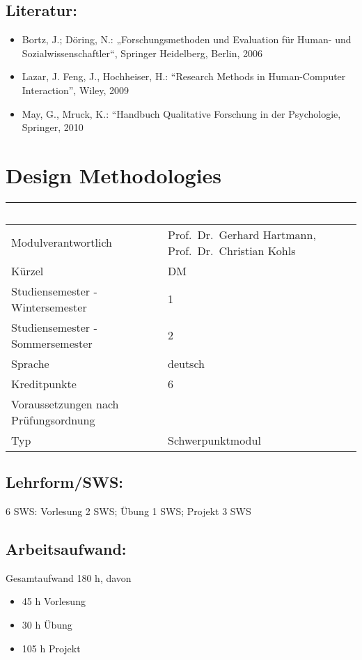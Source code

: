 \section*{Literatur:}\label{literatur-3}

\begin{itemize}
\item
  Bortz, J.; Döring, N.: „Forschungsmethoden und Evaluation für Human-
  und Sozialwissenschaftler``, Springer Heidelberg, Berlin, 2006
\item
  Lazar, J. Feng, J., Hochheiser, H.: ``Research Methods in
  Human-Computer Interaction'', Wiley, 2009
\item
  May, G., Mruck, K.: ``Handbuch Qualitative Forschung in der
  Psychologie, Springer, 2010
\end{itemize}

\chapter{Design Methodologies}\label{design-methodologies}

\begin{longtable}[]{@{}ll@{}}
\toprule
~ & ~\tabularnewline
\midrule
\endhead
Modulverantwortlich & Prof.~Dr.~Gerhard Hartmann, Prof.~Dr.~Christian
Kohls\tabularnewline
Kürzel & DM\tabularnewline
Studiensemester - Wintersemester & 1\tabularnewline
Studiensemester - Sommersemester & 2\tabularnewline
Sprache & deutsch\tabularnewline
Kreditpunkte & 6\tabularnewline
Voraussetzungen nach Prüfungsordnung &\tabularnewline
Typ & Schwerpunktmodul\tabularnewline
\bottomrule
\end{longtable}

\section*{Lehrform/SWS:}\label{lehrformsws-4}

6 SWS: Vorlesung 2 SWS; Übung 1 SWS; Projekt 3 SWS

\section*{Arbeitsaufwand:}\label{arbeitsaufwand-10}

Gesamtaufwand 180 h, davon

\begin{itemize}
\item
  45 h Vorlesung
\item
  30 h Übung
\item
  105 h Projekt
\end{itemize}

